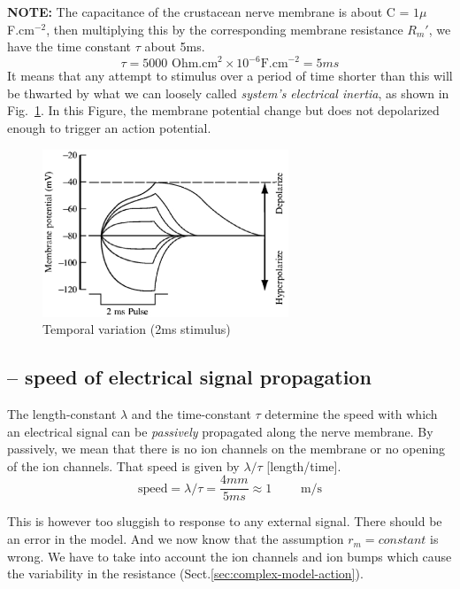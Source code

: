{\bf NOTE:} The capacitance of the crustacean nerve membrane is about
C = $1\mu $F.cm$^{-2}$, then multiplying this by the corresponding membrane
resistance $R_m'$, we have the time constant $\tau$ about 5ms. 
\begin{equation}
  \tau = 5000 \text{ Ohm.cm}^2 \times 10^{-6} \text{F.cm}^{-2} = 5ms
\end{equation}
It means that any attempt to stimulus over a period of time shorter
than this will be thwarted by what we can loosely called
{\it system's electrical inertia}, as shown in Fig.~\ref{fig:V-tv}. In
this Figure, the membrane potential change but does not depolarized
enough to trigger an action potential.
\begin{figure}[htb]
\centerline{\includegraphics[height=5cm]{./images/V-temporal_variation.eps}}
\caption{Temporal variation (2ms stimulus)}\label{fig:V-tv}
\end{figure} 

\subsection{-- speed of electrical signal propagation}

The length-constant $\lambda$ and the time-constant $\tau$ determine the speed
with which an electrical signal can be {\it passively} propagated along the
nerve membrane. By passively, we mean that there is no ion channels on
the membrane or no opening of the ion channels. That speed is given by
$\lambda/\tau$ [length/time].
\begin{equation}
  \text{speed} = \lambda/\tau = \frac{4mm}{5ms} \approx 1 \qquad \text{ m/s}
\end{equation}

This is however too sluggish to response to any external signal. There should
be an error in the model. And we now know that the assumption 
$r_m =constant$ is wrong. We have to take into account the ion channels and
ion bumps which cause the variability in the resistance
(Sect.\ref{sec:complex-model-action}).

